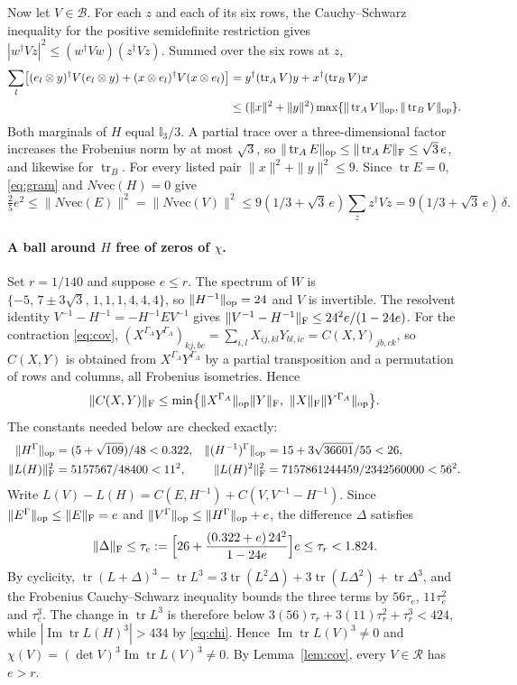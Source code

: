 \documentclass[11pt,a4paper]{article}
\theoremstyle{definition}\newtheorem{definition}[theorem]{Definition}\newtheorem*{conj}{Conjecture 9 of Shen, Chen and Bian}\newtheorem{remark}[theorem]{Remark}
\newcommand{\tr}{\operatorname{tr}}\newcommand{\im}{\operatorname{Im}}\newcommand{\adj}{\operatorname{adj}}\newcommand{\id}{\mathbb I}
\newcommand{\cB}{\mathcal B}\newcommand{\cR}{\mathcal R}\newcommand{\vecm}{\mathrm{vec}}
\begin{document}
Now let $V\in\cB$. For each $z$ and each of its six rows, the Cauchy--Schwarz inequality for the positive semidefinite restriction gives $|w^\dagger Vz|^2\leq(w^\dagger Vw)(z^\dagger Vz)$. Summed over the six rows at $z$,
\begin{align*}
 \sum_{l}\bigl[(e_l\otimes y)^\dagger V(e_l\otimes y)+(x\otimes e_l)^\dagger V(x\otimes e_l)\bigr]
 &=y^\dagger(\tr_A V)y+x^\dagger(\tr_B V)x\\
 &\leq(\|x\|^2+\|y\|^2)\max\{\|\tr_AV\|_\op,\|\tr_BV\|_\op\}.
\end{align*}
Both marginals of $H$ equal $\id_3/3$. A partial trace over a three-dimensional factor increases the Frobenius norm by at most $\sqrt3$, so $\|\tr_A E\|_\op\leq\|\tr_AE\|_\F\leq\sqrt3\,e$, and likewise for $\tr_B$. For every listed pair $\|x\|^2+\|y\|^2\leq9$. Since $\tr E=0$, \eqref{eq:gram} and $N\vecm(H)=0$ give
\begin{equation}\label{eq:dist}
 \tfrac25 e^2\leq\|N\vecm(E)\|^2
 =\|N\vecm(V)\|^2\leq9(1/3+\sqrt3\, e)\sum_z z^\dagger Vz=9(1/3+\sqrt3\, e)\,\delta .
\end{equation}

\paragraph{A ball around $H$ free of zeros of $\chi$.}
Set $r=1/140$ and suppose $e\leq r$. The spectrum of $W$ is $\{-5,\,7\pm3\sqrt3,\,1,1,1,4,4,4\}$, so $\|H^{-1}\|_{\mathrm{op}}=24$ and $V$ is invertible. The resolvent identity $V^{-1}-H^{-1}=-H^{-1}EV^{-1}$ gives
$\|V^{-1}-H^{-1}\|_\mathrm F\leq 24^2 e/(1-24e)$.
For the contraction \eqref{eq:cov}, $(X^{\Gamma_A}Y^{\Gamma_A})_{kj,bc}=\sum_{i,l}X_{ij,kl}Y_{bl,ic}=C(X,Y)_{jb,ck}$, so $C(X,Y)$ is obtained from $X^{\Gamma_A}Y^{\Gamma_A}$ by a partial transposition and a permutation of rows and columns, all Frobenius isometries. Hence
\[
 \|C(X,Y)\|_\F\leq\min\bigl\{\|X^{\Gamma_A}\|_\op\|Y\|_\F,\ \|X\|_\F\|Y^{\Gamma_A}\|_\op\bigr\}.
\]
The constants needed below are checked exactly:
\begin{align*}
 \|H^\Gamma\|_{\mathrm{op}}&=(5+\sqrt{109})/48<0.322, &
 \|(H^{-1})^\Gamma\|_{\mathrm{op}}&=15+3\sqrt{36601}/55<26,\\
 \|L(H)\|_\mathrm F^2&=5157567/48400<11^2,&
 \|L(H)^2\|_\mathrm F^2&=7157861244459/2342560000<56^2.
\end{align*}
Write $L(V)-L(H)=C(E,H^{-1})+C(V,V^{-1}-H^{-1})$. Since $\|E^\Gamma\|_{\mathrm{op}}\leq\|E\|_\mathrm F=e$ and $\|V^\Gamma\|_{\mathrm{op}}\leq\|H^\Gamma\|_{\mathrm{op}}+e$, the difference $\Delta$ satisfies
\[
 \|\Delta\|_\mathrm F\leq\tau_e:=\Bigl[26+\frac{(0.322+e)\,24^2}{1-24e}\Bigr]e
 \leq \tau_r<1.824 .
\]
By cyclicity, $\tr(L+\Delta)^3-\tr L^3=3\tr(L^2\Delta)+3\tr(L\Delta^2)+\tr\Delta^3$, and the Frobenius Cauchy--Schwarz inequality bounds the three terms by $56\tau_e$, $11\tau_e^2$ and $\tau_e^3$. The change in $\tr L^3$ is therefore below $3(56)\tau_r+3(11)\tau_r^2+\tau_r^3<424$, while $|\im\tr L(H)^3|>434$ by \eqref{eq:chi}. Hence $\im\tr L(V)^3\neq0$ and $\chi(V)=(\det V)^3\im\tr L(V)^3\neq0$. By Lemma~\ref{lem:cov}, every $V\in\cR$ has $e>r$.
\end{document}
